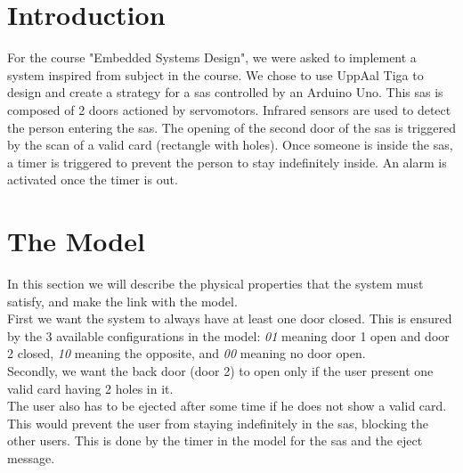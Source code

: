 

 

\thispagestyle{empty}

\titleTH %

\newpage

\tableofcontents
\newpage
\section{Introduction}
For the course "Embedded Systems Design", we were asked to implement a system inspired from subject in the course. We chose to use UppAal Tiga to design and create a strategy for a sas controlled by an Arduino Uno. This sas is composed of 2 doors actioned by servomotors. Infrared sensors are used to detect the person entering the sas. The opening of the second door of the sas is triggered by the scan of a valid card (rectangle with holes). Once someone is inside the sas, a timer is triggered to prevent the person to stay indefinitely inside. An alarm is activated once the timer is out.

\section{The Model}

In this section we will describe the physical properties that the system must satisfy, and make the link with the model.\\

First we want the system to always have at least one door closed. This is ensured by the 3 available configurations in the model: \emph{01} meaning door 1 open and door 2 closed, \emph{10} meaning the opposite, and \emph{00} meaning no door open.\\

Secondly, we want the back door (door 2) to open only if the user present one valid card having 2 holes in it.\\

The user also has to be ejected after some time if he does not show a valid card. This would prevent the user from staying indefinitely in the sas, blocking the other users. This is done by the timer in the model for the sas and the eject message. \\

